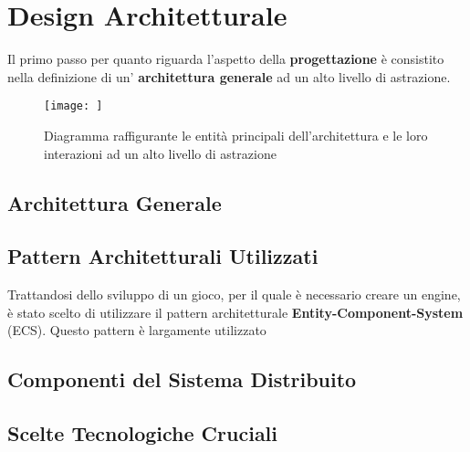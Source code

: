\chapter{Design Architetturale}
Il primo passo per quanto riguarda l'aspetto della \textbf{progettazione} è consistito nella definizione di un' \textbf{architettura generale} ad un alto livello di astrazione. 

\begin{figure}[H]
	\centering
	\texttt{[image: ]}
	\caption{Diagramma raffigurante le entità principali dell'architettura e le loro interazioni ad un alto livello di astrazione}
	\label{fig:figure2}
\end{figure}
	
\section{Architettura Generale}
\section{Pattern Architetturali Utilizzati}
Trattandosi dello sviluppo di un gioco, per il quale è necessario creare un engine, è stato scelto di utilizzare il pattern architetturale \textbf{Entity-Component-System} (ECS). Questo pattern è largamente utilizzato

\section{Componenti del Sistema Distribuito}
\section{Scelte Tecnologiche Cruciali}

